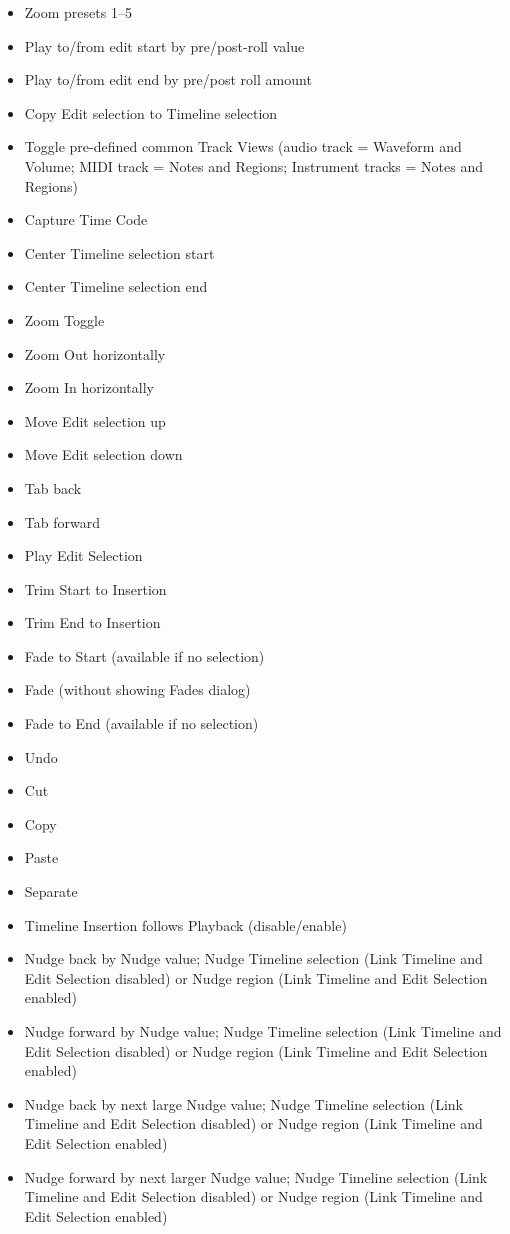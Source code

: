 \documentclass[11pt,a4paper,notitlepage]{article}
\begin{document}
\begin{itemize}
\item Zoom presets 1–5
\item Play to/from edit start by pre/post-roll value
\item Play to/from edit end by pre/post roll amount
\item Copy Edit selection to Timeline selection
\item Toggle pre-defined common Track Views (audio track = Waveform and Volume; MIDI track = Notes and Regions; Instrument tracks = Notes and Regions)
\item Capture Time Code
\item Center Timeline selection start
\item Center Timeline selection end
\item Zoom Toggle
\item Zoom Out horizontally
\item Zoom In horizontally
\item Move Edit selection up
\item Move Edit selection down
\item Tab back
\item Tab forward
\item Play Edit Selection
\item Trim Start to Insertion
\item Trim End to Insertion
\item Fade to Start (available if no selection)
\item Fade (without showing Fades dialog)
\item Fade to End (available if no selection)
\item Undo
\item Cut
\item Copy
\item Paste
\item Separate
\item Timeline Insertion follows Playback (disable/enable)
\item Nudge back by Nudge value; Nudge Timeline selection (Link Timeline and Edit Selection disabled) or Nudge region (Link Timeline and Edit Selection enabled)
\item Nudge forward by Nudge value; Nudge Timeline selection (Link Timeline and Edit Selection disabled) or Nudge region (Link Timeline and Edit Selection enabled)
\item Nudge back by next large Nudge value; Nudge Timeline selection (Link Timeline and Edit Selection disabled) or Nudge region (Link Timeline and Edit Selection enabled)
\item Nudge forward by next larger Nudge value; Nudge Timeline selection (Link Timeline and Edit Selection disabled) or Nudge region (Link Timeline and Edit Selection enabled)
\end{itemize}
\end{document}
